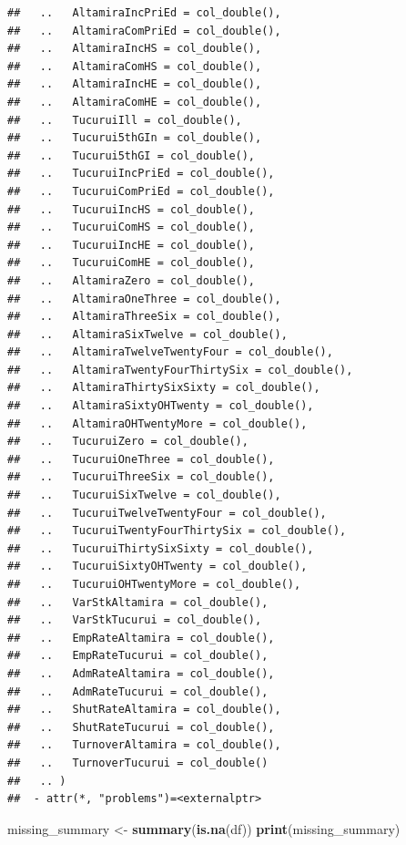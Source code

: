 \documentclass[
]{article}
\newenvironment{Shaded}{\begin{snugshade}}{\end{snugshade}}
\newcommand{\FunctionTok}[1]{\textcolor[rgb]{0.13,0.29,0.53}{\textbf{#1}}}
\newcommand{\NormalTok}[1]{#1}
\newcommand{\OtherTok}[1]{\textcolor[rgb]{0.56,0.35,0.01}{#1}}
\begin{document}
\begin{verbatim}
##   ..   AltamiraIncPriEd = col_double(),
##   ..   AltamiraComPriEd = col_double(),
##   ..   AltamiraIncHS = col_double(),
##   ..   AltamiraComHS = col_double(),
##   ..   AltamiraIncHE = col_double(),
##   ..   AltamiraComHE = col_double(),
##   ..   TucuruiIll = col_double(),
##   ..   Tucurui5thGIn = col_double(),
##   ..   Tucurui5thGI = col_double(),
##   ..   TucuruiIncPriEd = col_double(),
##   ..   TucuruiComPriEd = col_double(),
##   ..   TucuruiIncHS = col_double(),
##   ..   TucuruiComHS = col_double(),
##   ..   TucuruiIncHE = col_double(),
##   ..   TucuruiComHE = col_double(),
##   ..   AltamiraZero = col_double(),
##   ..   AltamiraOneThree = col_double(),
##   ..   AltamiraThreeSix = col_double(),
##   ..   AltamiraSixTwelve = col_double(),
##   ..   AltamiraTwelveTwentyFour = col_double(),
##   ..   AltamiraTwentyFourThirtySix = col_double(),
##   ..   AltamiraThirtySixSixty = col_double(),
##   ..   AltamiraSixtyOHTwenty = col_double(),
##   ..   AltamiraOHTwentyMore = col_double(),
##   ..   TucuruiZero = col_double(),
##   ..   TucuruiOneThree = col_double(),
##   ..   TucuruiThreeSix = col_double(),
##   ..   TucuruiSixTwelve = col_double(),
##   ..   TucuruiTwelveTwentyFour = col_double(),
##   ..   TucuruiTwentyFourThirtySix = col_double(),
##   ..   TucuruiThirtySixSixty = col_double(),
##   ..   TucuruiSixtyOHTwenty = col_double(),
##   ..   TucuruiOHTwentyMore = col_double(),
##   ..   VarStkAltamira = col_double(),
##   ..   VarStkTucurui = col_double(),
##   ..   EmpRateAltamira = col_double(),
##   ..   EmpRateTucurui = col_double(),
##   ..   AdmRateAltamira = col_double(),
##   ..   AdmRateTucurui = col_double(),
##   ..   ShutRateAltamira = col_double(),
##   ..   ShutRateTucurui = col_double(),
##   ..   TurnoverAltamira = col_double(),
##   ..   TurnoverTucurui = col_double()
##   .. )
##  - attr(*, "problems")=<externalptr>
\end{verbatim}

\begin{Shaded}
\begin{Highlighting}[]
\NormalTok{missing\_summary }\OtherTok{\textless{}{-}} \FunctionTok{summary}\NormalTok{(}\FunctionTok{is.na}\NormalTok{(df))}
\FunctionTok{print}\NormalTok{(missing\_summary)}
\end{Highlighting}
\end{Shaded}
\end{document}
